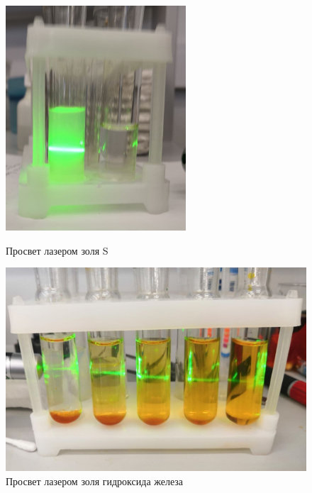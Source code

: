 \documentclass[a4paper, 12pt]{article}
\begin{document}
\begin{figure}[h]
\begin{center}
\begin{minipage}[h]{0.44\linewidth}
\begin{center}
\includegraphics[width=0.6\textwidth]{photo_2021-03-12_18-41-31.jpg}
\caption{Просвет лазером золя S} %
\label{ris:experimoriginal} %
\end{center}
\end{minipage}
\hfill 
\begin{minipage}[h]{0.44\linewidth}
\begin{center}
\includegraphics[width=1\textwidth]{photo_2021-03-12_18-41-28.jpg}
\caption{Просвет лазером золя гидроксида железа}
\label{ris:experimcoded}
\end{center}
\end{minipage}
\end{center}
\end{figure}
\end{document}
